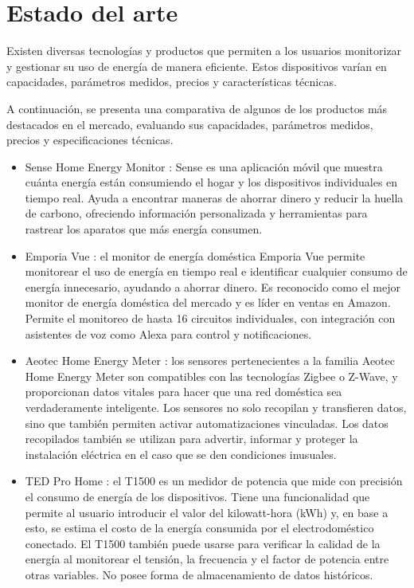 \newpage

\section{Estado del arte}

Existen diversas tecnologías y productos que permiten a los usuarios monitorizar y gestionar su uso de energía de manera eficiente. Estos dispositivos varían en capacidades, parámetros medidos, precios y características técnicas. 

A continuación, se presenta una comparativa de algunos de los productos más destacados en el mercado, evaluando sus capacidades, parámetros medidos, precios y especificaciones técnicas.

\begin{itemize}
    \item Sense Home Energy Monitor \cite{competencia1}: 
    Sense es una aplicación móvil que muestra cuánta energía están consumiendo el hogar y los dispositivos individuales en tiempo real. Ayuda a encontrar maneras de ahorrar dinero y reducir la huella de carbono, ofreciendo información personalizada y herramientas para rastrear los aparatos que más energía consumen.

    \item Emporia Vue \cite{competencia2}:
    el monitor de energía doméstica Emporia Vue permite monitorear el uso de energía en tiempo real e identificar cualquier consumo de energía innecesario, ayudando a ahorrar dinero. Es reconocido como el mejor monitor de energía doméstica del mercado y es líder en ventas en Amazon. Permite el monitoreo de hasta 16 circuitos individuales, con integración con asistentes de voz como Alexa para control y notificaciones.

    \item Aeotec Home Energy Meter \cite{competencia3}:
    los sensores pertenecientes a la familia Aeotec Home Energy Meter son compatibles con las tecnologías Zigbee o Z-Wave, y proporcionan datos vitales para hacer que una red doméstica sea verdaderamente inteligente. Los sensores no solo recopilan y transfieren datos, sino que también permiten activar automatizaciones vinculadas. Los datos recopilados también se utilizan para advertir, informar y proteger la instalación eléctrica en el caso que se den condiciones inusuales.

    \item TED Pro Home \cite{competencia4}:
    el T1500 es un medidor de potencia que mide con precisión el consumo de energía de los dispositivos. Tiene una funcionalidad que permite al usuario introducir el valor del kilowatt-hora (kWh) y, en base a esto, se estima el costo de la energía consumida por el electrodoméstico conectado. El T1500 también puede usarse para verificar la calidad de la energía al monitorear el tensión, la frecuencia y el factor de potencia entre otras variables. No posee forma de almacenamiento de datos históricos.


\end{itemize}
